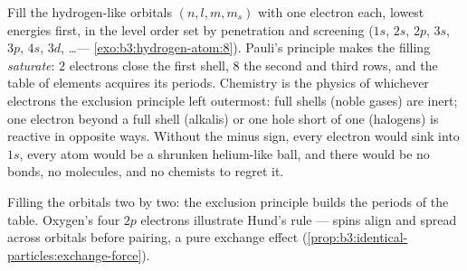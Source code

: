 \begin{proposition}\label{prop:b3:identical-particles:periodic}
Fill the hydrogen-like orbitals $(n, l, m, m_s)$ with one electron
each, lowest energies first, in the level order set by penetration
and screening ($1s$, $2s$, $2p$, $3s$, $3p$, $4s$, $3d$, \dots ---
\cref{exo:b3:hydrogen-atom:8}). Pauli's principle makes the filling
\emph{saturate}: $2$ electrons close the first shell, $8$ the
second and third rows, and the table of elements acquires its
periods. Chemistry is the physics of whichever electrons the
exclusion principle left outermost: full shells (noble gases) are
inert; one electron beyond a full shell (alkalis) or one hole short
of one (halogens) is reactive in opposite ways. Without the minus
sign, every electron would sink into $1s$, every atom would be a
shrunken helium-like ball, and there would be no bonds, no
molecules, and no chemists to regret it.
\end{proposition}
\admitted

\begin{omfigure}

{\small Filling the orbitals two by two: the exclusion principle
builds the periods of the table. Oxygen's four $2p$ electrons
illustrate Hund's rule --- spins align and spread across orbitals
before pairing, a pure exchange effect
(\cref{prop:b3:identical-particles:exchange-force}).}
\end{omfigure}

